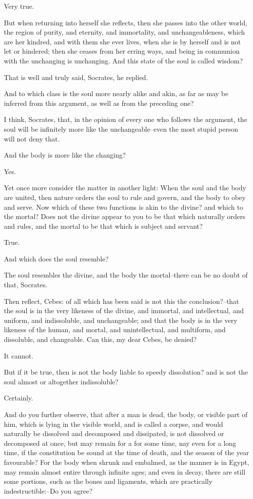 Very true.

But when returning into herself she reflects, then she passes into the
other world, the region of purity, and eternity, and immortality, and
unchangeableness, which are her kindred, and with them she ever lives,
when she is by herself and is not let or hindered; then she ceases
from her erring ways, and being in communion with the unchanging is
unchanging. And this state of the soul is called wisdom?

That is well and truly said, Socrates, he replied.

And to which class is the soul more nearly alike and akin, as far as may
be inferred from this argument, as well as from the preceding one?

I think, Socrates, that, in the opinion of every one who follows the
argument, the soul will be infinitely more like the unchangeable--even
the most stupid person will not deny that.

And the body is more like the changing?

Yes.

Yet once more consider the matter in another light: When the soul and
the body are united, then nature orders the soul to rule and govern, and
the body to obey and serve. Now which of these two functions is akin to
the divine? and which to the mortal? Does not the divine appear to you
to be that which naturally orders and rules, and the mortal to be that
which is subject and servant?

True.

And which does the soul resemble?

The soul resembles the divine, and the body the mortal--there can be no
doubt of that, Socrates.

Then reflect, Cebes: of all which has been said is not this the
conclusion?--that the soul is in the very likeness of the divine,
and immortal, and intellectual, and uniform, and indissoluble, and
unchangeable; and that the body is in the very likeness of the human,
and mortal, and unintellectual, and multiform, and dissoluble, and
changeable. Can this, my dear Cebes, be denied?

It cannot.

But if it be true, then is not the body liable to speedy dissolution?
and is not the soul almost or altogether indissoluble?

Certainly.

And do you further observe, that after a man is dead, the body, or
visible part of him, which is lying in the visible world, and is
called a corpse, and would naturally be dissolved and decomposed and
dissipated, is not dissolved or decomposed at once, but may remain for a
for some time, nay even for a long time, if the constitution be sound at
the time of death, and the season of the year favourable? For the body
when shrunk and embalmed, as the manner is in Egypt, may remain almost
entire through infinite ages; and even in decay, there are still
some portions, such as the bones and ligaments, which are practically
indestructible:--Do you agree?

